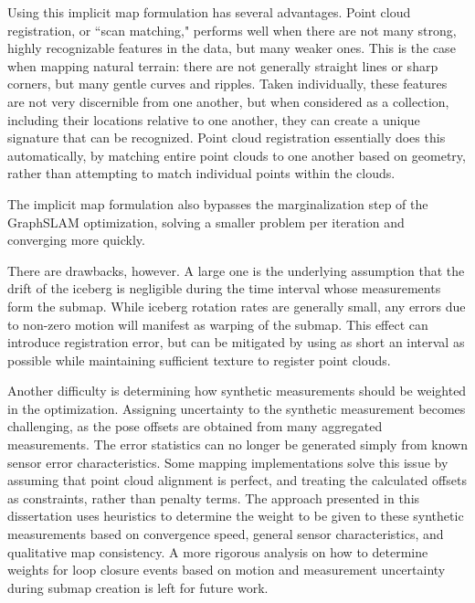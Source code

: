 
Using this implicit map formulation has several advantages. Point cloud registration, or ``scan matching," performs well when there are not many strong, highly recognizable features in the data, but many weaker ones. This is the case when mapping natural terrain: there are not generally straight lines or sharp corners, but many gentle curves and ripples. Taken individually, these features are not very discernible from one another, but when considered as a collection, including their locations relative to one another, they can create a unique signature that can be recognized. Point cloud registration essentially does this automatically, by matching entire point clouds to one another based on geometry, rather than attempting to match individual points within the clouds.

The implicit map formulation also bypasses the marginalization step of the GraphSLAM optimization, solving a smaller problem per iteration and converging more quickly. 

There are drawbacks, however. A large one is the underlying assumption that the drift of the iceberg is negligible during the time interval whose measurements form the submap. While iceberg rotation rates are generally small, any errors due to non-zero motion will manifest as warping of the submap. This effect can introduce registration error, but can be mitigated by using as short an interval as possible while maintaining sufficient texture to register point clouds.

Another difficulty is determining how synthetic measurements should be weighted in the optimization. Assigning uncertainty to the synthetic measurement becomes challenging, as the pose offsets are obtained from many aggregated measurements. The error statistics can no longer be generated simply from known sensor error characteristics. Some mapping implementations solve this issue by assuming that point cloud alignment is perfect, and treating the calculated offsets as constraints, rather than penalty terms. The approach presented in this dissertation uses heuristics to determine the weight to be given to these synthetic measurements based on convergence speed, general sensor characteristics, and qualitative map consistency. A more rigorous analysis on how to determine weights for loop closure events based on motion and measurement uncertainty during submap creation is left for future work.

